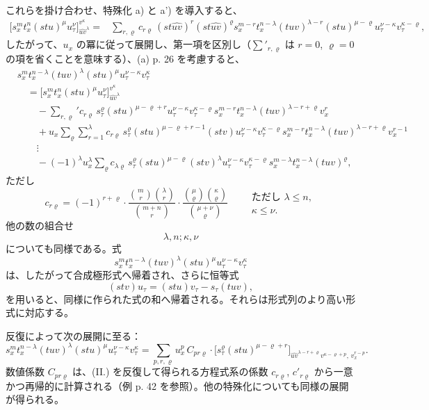 \documentclass[11pt]{jlreq}
\begin{document}
これらを掛け合わせ、特殊化 a) と a') を導入すると、
\[
\begin{aligned}
\bigl[s_x^m t_x^n(stu)^\mu u_\tau^\nu\bigr]_{\widehat{uv}^{\lambda}}^{v^\kappa}
={}&
\sum_{r,\varrho}c_{r\varrho}\,
(st\widehat{uv})^r(st\widehat{uv})^\varrho
s_x^{m-r}t_x^{n-\lambda}(tuv)^{\lambda-r}(stu)^{\mu-\varrho}
u_\tau^{\nu-\kappa}v_\tau^{\kappa-\varrho},
\end{aligned}
\]
したがって、$u_x$ の冪に従って展開し、第一項を区別し（$\sum'_{r,\varrho}$ は $r=0$, $\varrho=0$ の項を省くことを意味する）、(a) p. 26 を考慮すると、
\[
\tag{II}
\begin{aligned}
&s_x^m t_x^{n-\lambda}(tuv)^\lambda(stu)^\mu u_\tau^{\nu-\kappa}v_\tau^\kappa\\
&\quad =
\bigl[s_x^m t_x^n(stu)^\mu u_\tau^\nu\bigr]_{\widehat{uv}^{\lambda}}^{v^\kappa}\\
&\qquad
-\sum_{r,\varrho}' c_{r\varrho}\,s_\tau^\varrho(stu)^{\mu-\varrho+r}
u_\tau^{\nu-\kappa}v_\tau^{\kappa-\varrho}
s_x^{m-r}t_x^{n-\lambda}(tuv)^{\lambda-r+\varrho}v_x^r\\
&\qquad
+u_x\sum_{\varrho}\sum_{r=1}^{\lambda} c_{r\varrho}\,
s_\tau^\varrho(stu)^{\mu-\varrho+r-1}(stv)
u_\tau^{\nu-\kappa}v_\tau^{\kappa-\varrho}
s_x^{m-r}t_x^{n-\lambda}(tuv)^{\lambda-r+\varrho}v_x^{r-1}\\
&\qquad
\vdots\\
&\qquad
-(-1)^\lambda u_x^\lambda\sum_\varrho c_{\lambda\varrho}\,
s_\tau^\varrho(stu)^{\mu-\varrho}(stv)^\lambda
u_\tau^{\nu-\kappa}v_\tau^{\kappa-\varrho}
s_x^{m-\lambda}t_x^{n-\lambda}(tuv)^\varrho,
\end{aligned}
\]
ただし
\[
c_{r\varrho}=(-1)^{r+\varrho}\cdot
\frac{\binom{m}{r}\binom{\lambda}{r}}{\binom{m+n}{r}}\cdot
\frac{\binom{\mu}{\varrho}\binom{\kappa}{\varrho}}{\binom{\mu+\nu}{\varrho}}
\qquad
\begin{array}{l}
\text{ただし }\lambda\le n,\\
\kappa\le\nu.
\end{array}
\]
他の数の組合せ
\[\lambda,n;\kappa,\nu\]
についても同様である。式
\[s_x^m t_x^{n-\lambda}(tuv)^\lambda(stu)^\mu u_\tau^{\nu-\kappa}v_\tau^\kappa\]
は、したがって合成極形式へ帰着され、さらに恒等式
\[
(stv)u_\tau=(stu)v_\tau-s_\tau(tuv),
\]
を用いると、同様に作られた式の和へ帰着される。それらは形式列のより高い形式に対応する。

反復によって次の展開に至る：
\[
\tag{III}
s_x^m t_x^{n-\lambda}(tuv)^\lambda(stu)^\mu u_\tau^{\nu-\kappa}v_\tau^\kappa
=
\sum_{p,r,\varrho}u_x^p\,C_{pr\varrho}\cdot
\bigl[s_\tau^\varrho(stu)^{\mu-\varrho+r}\bigr]_{\widehat{uv}^{\lambda-r+\varrho}v^{\kappa-\varrho+p},\,v_x^{r-p}}.
\]
数値係数 $C_{pr\varrho}$ は、(II.) を反復して得られる方程式系の係数 $c_{r\varrho}$, $c'_{r\varrho}$ から一意かつ再帰的に計算される（例 p. 42 を参照）。他の特殊化についても同様の展開が得られる。
\end{document}
